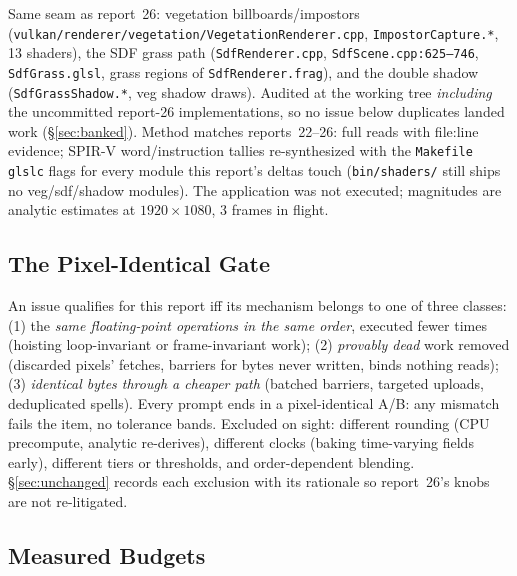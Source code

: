 \documentclass[11pt,a4paper]{article}
\begin{document}
Same seam as report~26: vegetation billboards/impostors
(\texttt{vulkan/renderer/vegetation/VegetationRenderer.cpp},
\texttt{ImpostorCapture.*}, 13 shaders), the SDF grass path
(\texttt{SdfRenderer.cpp}, \texttt{SdfScene.cpp:625--746},
\texttt{SdfGrass.glsl}, grass regions of \texttt{SdfRenderer.frag}), and
the double shadow (\texttt{SdfGrassShadow.*}, veg shadow draws). Audited at
the working tree \emph{including} the uncommitted report-26
implementations, so no issue below duplicates landed work
(\S\ref{sec:banked}). Method matches reports~22--26: full reads with
file:line evidence; SPIR-V word/instruction tallies re-synthesized with the
\texttt{Makefile} \texttt{glslc} flags for every module this report's
deltas touch (\texttt{bin/shaders/} still ships no veg/sdf/shadow modules).
The application was not executed; magnitudes are analytic estimates at
$1920\times1080$, 3 frames in flight.

\subsection{The Pixel-Identical Gate}
\label{sec:gate}

An issue qualifies for this report iff its mechanism belongs to one of
three classes: (1) the \emph{same floating-point operations in the same
order}, executed fewer times (hoisting loop-invariant or
frame-invariant work); (2) \emph{provably dead} work removed (discarded
pixels' fetches, barriers for bytes never written, binds nothing reads);
(3) \emph{identical bytes through a cheaper path} (batched barriers,
targeted uploads, deduplicated spells). Every prompt ends in a
pixel-identical A/B: any mismatch fails the item, no tolerance bands.
Excluded on sight: different rounding (CPU precompute, analytic re-derives),
different clocks (baking time-varying fields early), different tiers or
thresholds, and order-dependent blending. \S\ref{sec:unchanged} records each
exclusion with its rationale so report~26's knobs are not re-litigated.

\subsection{Measured Budgets}
\end{document}
